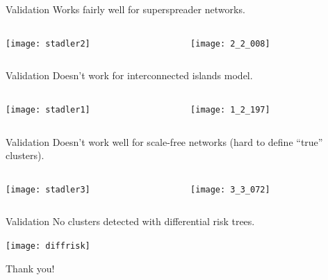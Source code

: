 \documentclass{beamer}
\begin{document}
\begin{frame}{Validation}
    Works fairly well for superspreader networks.
    \vspace{0.5cm}
    \begin{columns}
        \begin{column}{0.5\textwidth}
            \texttt{[image: stadler2]}
        \end{column}
        \begin{column}{0.5\textwidth}
            \texttt{[image: 2\_2\_008]}
        \end{column}
    \end{columns}
\end{frame}

\begin{frame}{Validation}
    Doesn't work for interconnected islands model.
    \vspace{0.5cm}
    \begin{columns}
        \begin{column}{0.5\textwidth}
            \texttt{[image: stadler1]}
        \end{column}
        \begin{column}{0.5\textwidth}
            \texttt{[image: 1\_2\_197]}
        \end{column}
    \end{columns}
\end{frame}

\begin{frame}{Validation}
    Doesn't work well for scale-free networks (hard to define ``true'' clusters).
    \vspace{0.5cm}
    \begin{columns}
        \begin{column}{0.5\textwidth}
            \texttt{[image: stadler3]}
        \end{column}
        \begin{column}{0.5\textwidth}
            \texttt{[image: 3\_3\_072]}
        \end{column}
    \end{columns}
\end{frame}

\begin{frame}{Validation}
    No clusters detected with differential risk trees.

    \vspace{0.5cm}
    \begin{center}
    \texttt{[image: diffrisk]}
    \end{center}
\end{frame}

\begin{frame}
    \begin{center}
    \Huge{Thank you!}
    \end{center}
\end{frame}
\end{document}
